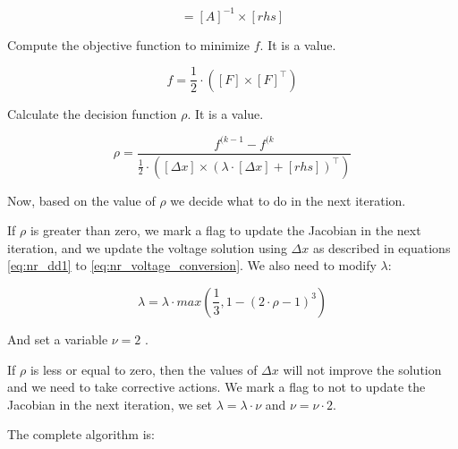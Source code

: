 \documentclass[nols,a4paper,twoside,notoc,fleqn]{tufte-book}
\begin{document}
\begin{equation}
[\Delta x] = [A]^{-1} \times [rhs]
\label{eq:lm_solve}
\end{equation}


Compute the objective function to minimize $f$. It is a value.

\begin{equation}
f = \frac{1}{2} \cdot \left([F] \times [F]^\top \right)
\label{eq:lm_f}
\end{equation}

Calculate the decision function $\rho$. It is a value.


\begin{equation}
\rho = \frac{f^{(k-1}-f^{(k}}{\frac{1}{2} \cdot \left([\Delta x] \times (\lambda \cdot [\Delta x] + [rhs])^\top \right)}
\label{eq:lm_rho}
\end{equation}

Now, based on the value of $\rho$ we decide what to do in the next iteration.

If $\rho$ is greater than zero, we mark a flag to update the Jacobian in the next iteration, and we update the voltage solution using $\Delta x$ as described in equations  \ref{eq:nr_dd1} to \ref{eq:nr_voltage_conversion}. We also need to modify $\lambda$:


\begin{equation}
\lambda = \lambda \cdot max \left( \frac{1}{3}, 1-(2\cdot \rho -1)^3 \right)
\label{eq:lm_update_l}
\end{equation}

And set a variable $\nu=2$ .


If $\rho$ is less or equal to zero, then the values of $\Delta x$ will not improve the solution and we need to take corrective actions. We mark a flag to not to update the Jacobian in the next iteration, we set $\lambda=\lambda \cdot \nu$ and $\nu = \nu \cdot 2$.


The complete algorithm is: 
\end{document}
